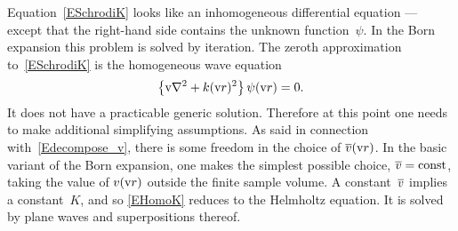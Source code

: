 Equation~\cref{ESchrodiK} looks
like an inhomogeneous differential equation ---
except that the right-hand side contains the unknown function~$\psi$.
In the Born expansion this problem is solved by iteration.
The zeroth approximation to~\cref{ESchrodiK} is the homogeneous wave equation
\begin{equation}\label{EHomoK}
  \left\{\text{v}{\nabla}^2+k(\text{v}{r})^2\right\}\psi(\text{v}{r}) = 0.
\end{equation}
It does not have a practicable generic solution.
Therefore at this point one needs to make additional simplifying assumptions.
As said in connection with~\cref{Edecompose_v},
there is some freedom in the choice of $\overline{v}(\text{v}{r})$.
In the basic variant of the Born expansion,
one makes the simplest possible choice, $\overline{v}=\text{const}$,
taking the value of $v(\text{v}{r})$ outside the finite sample volume.
A constant~$\overline{v}$ implies a constant~$K$,
and so \cref{EHomoK} reduces to the Helmholtz equation.
%
%
It is solved by plane waves and superpositions thereof.

